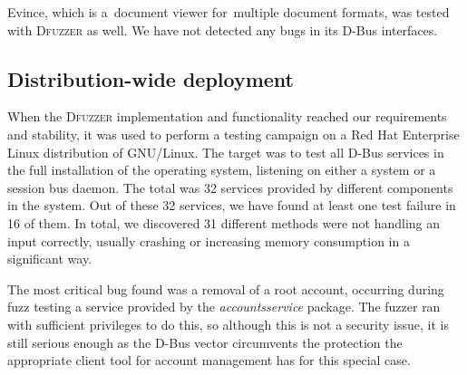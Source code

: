 \documentclass[conference]{IEEEtran}
\begin{document}
Evince, which is a~document viewer for~multiple document formats, was tested
with \textsc{Dfuzzer} as well. We have not detected any bugs in its D-Bus interfaces.

\subsection{Distribution-wide deployment}
When the \textsc{Dfuzzer} implementation and functionality reached our requirements
and stability, it was used to perform a testing campaign on a Red Hat Enterprise
Linux distribution of GNU/Linux. The target was to test all D-Bus services in
the full installation of the operating system, listening on either a system or a
session bus daemon. The total was 32 services provided by different components
in the system. Out of these 32 services, we have found at least one test failure
in 16 of them. In total, we discovered 31 different methods were not handling an
input correctly, usually crashing or increasing memory consumption in a
significant way.

The most critical bug found was a removal of a root account, occurring during
fuzz testing a service provided by the \emph{accountsservice} package. The fuzzer
ran with sufficient privileges to do this, so although this is not a security
issue, it is still serious enough as the D-Bus vector circumvents the protection
the appropriate client tool for account management has for this special case.
\end{document}
